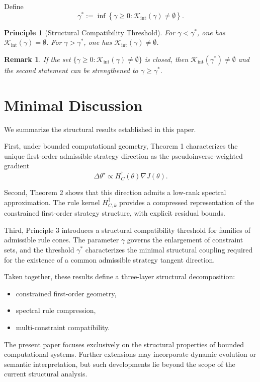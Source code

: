\documentclass[11pt,a4paper,twocolumn]{article}
\newtheorem*{remark*}{Remark}
\newtheorem{principle}[theorem]{Principle}
\begin{document}
Define
\[
\gamma^*
:=
\inf
\left\{
\gamma \ge 0 :
\mathcal{K}_{\mathrm{int}}(\gamma) \neq \emptyset
\right\}.
\]

\begin{principle}[Structural Compatibility Threshold]
 For $\gamma < \gamma^*$, one has $\mathcal{K}_{\mathrm{int}}(\gamma)=\emptyset$.
 For $\gamma > \gamma^*$, one has $\mathcal{K}_{\mathrm{int}}(\gamma)\neq\emptyset$.
\end{principle}

\begin{remark*}
 If the set $\{\gamma\ge 0:\mathcal{K}_{\mathrm{int}}(\gamma)\neq\emptyset\}$ is closed,
 then $\mathcal{K}_{\mathrm{int}}(\gamma^*)\neq\emptyset$ and the second statement can be strengthened to
 $\gamma \ge \gamma^*$.
\end{remark*}

\section{Minimal Discussion}

We summarize the structural results established in this paper.

First, under bounded computational geometry,
Theorem 1 characterizes the unique first-order admissible strategy direction
as the pseudoinverse-weighted gradient
\[
\Delta\theta^\star \propto H_C^\dagger(\theta)\nabla J(\theta).
\]

Second, Theorem 2 shows that this direction admits
a low-rank spectral approximation.
The rule kernel $H_{C,k}^\dagger$ provides
a compressed representation of the constrained first-order strategy structure,
with explicit residual bounds.

Third, Principle 3 introduces a structural compatibility threshold
for families of admissible rule cones.
The parameter $\gamma$ governs the enlargement of constraint sets,
and the threshold $\gamma^*$ characterizes
the minimal structural coupling required
for the existence of a common admissible strategy tangent direction.

Taken together,
these results define a three-layer structural decomposition:

\begin{itemize}
 \item constrained first-order geometry,
 \item spectral rule compression,
 \item multi-constraint compatibility.
\end{itemize}

The present paper focuses exclusively on
the structural properties of bounded computational systems.
Further extensions may incorporate
dynamic evolution or semantic interpretation,
but such developments lie beyond the scope of the current structural analysis.
 
 


\end{document}
